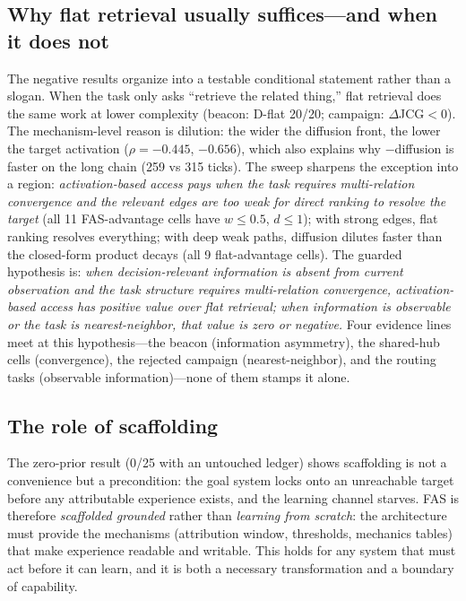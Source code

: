 \documentclass[10pt]{article}
\begin{document}
\subsection{Why flat retrieval usually suffices---and when it does not}
The negative results organize into a testable conditional statement rather than a slogan. When the task only asks ``retrieve the related thing,'' flat retrieval does the same work at lower complexity (beacon: D-flat 20/20; campaign: $\Delta$JCG${<}0$). The mechanism-level reason is dilution: the wider the diffusion front, the lower the target activation ($\rho{=}{-}0.445$, ${-}0.656$), which also explains why $-$diffusion is faster on the long chain (259 vs 315 ticks). The sweep sharpens the exception into a region: \emph{activation-based access pays when the task requires multi-relation convergence and the relevant edges are too weak for direct ranking to resolve the target} (all 11 FAS-advantage cells have $w{\le}0.5$, $d{\le}1$); with strong edges, flat ranking resolves everything; with deep weak paths, diffusion dilutes faster than the closed-form product decays (all 9 flat-advantage cells). The guarded hypothesis is: \emph{when decision-relevant information is absent from current observation and the task structure requires multi-relation convergence, activation-based access has positive value over flat retrieval; when information is observable or the task is nearest-neighbor, that value is zero or negative.} Four evidence lines meet at this hypothesis---the beacon (information asymmetry), the shared-hub cells (convergence), the rejected campaign (nearest-neighbor), and the routing tasks (observable information)---none of them stamps it alone.

\subsection{The role of scaffolding}
The zero-prior result (0/25 with an untouched ledger) shows scaffolding is not a convenience but a precondition: the goal system locks onto an unreachable target before any attributable experience exists, and the learning channel starves. FAS is therefore \emph{scaffolded grounded} rather than \emph{learning from scratch}: the architecture must provide the mechanisms (attribution window, thresholds, mechanics tables) that make experience readable and writable. This holds for any system that must act before it can learn, and it is both a necessary transformation and a boundary of capability.
\end{document}
